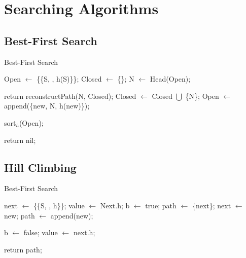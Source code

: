 \newpage
\section{Searching Algorithms}

\subsection{Best-First Search}

\begin{algorithm}[ht]
\caption{Best-First Search}
\begin{algorithmic}
\State Open \(\gets\) \{\{S, , h(S)\}\}; 
\State Closed \(\gets\) \{\}; 
\vspace{0.1cm}
    \State N \(\gets\) Head(Open); 
    
    \vspace{0.07cm}
        \State return reconstructPath(N, Closed); 
    \Else
        \State Closed \(\gets\) Closed \(\bigcup\) \{N\}; 
                \State Open \(\gets\) append(\{new, N, h(new)\}); 
            \EndIf
        \EndFor

        \State sort\(_{h}\)(Open); 
    \EndIf
    \vspace{0.07cm}
\EndWhile

\vspace{0.1cm}
\State return nil; 
\end{algorithmic}
\end{algorithm}


\subsection{Hill Climbing}

\begin{algorithm}[ht]
\caption{Best-First Search}
\begin{algorithmic}
\State next \(\gets\) \{\{S, , h\}\}; 
\State value \(\gets\) Next.h;
\State b \(\gets\) true;
\State path \(\gets\) \{next\};
\vspace{0.1cm}
\State next \(\gets\) new;
\State path \(\gets\) append(new);
\EndIf
\EndFor
    
\State b \(\gets\) false;
\Else
\State value \(\gets\) next.h;
\EndIf
\EndWhile

\vspace{0.1cm}
\State return path; 
\end{algorithmic}
\end{algorithm}

